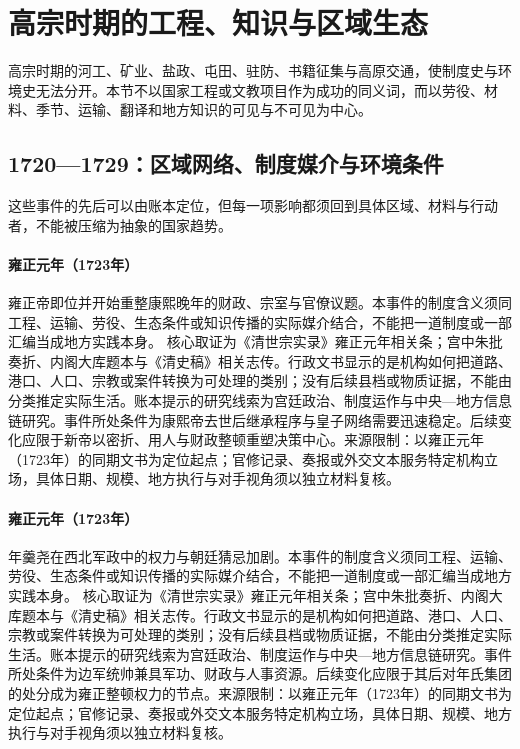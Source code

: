 \section{高宗时期的工程、知识与区域生态}
高宗时期的河工、矿业、盐政、屯田、驻防、书籍征集与高原交通，使制度史与环境史无法分开。本节不以国家工程或文教项目作为成功的同义词，而以劳役、材料、季节、运输、翻译和地方知识的可见与不可见为中心。
\subsection{1720—1729：区域网络、制度媒介与环境条件}
这些事件的先后可以由账本定位，但每一项影响都须回到具体区域、材料与行动者，不能被压缩为抽象的国家趋势。
\hypertarget{civic:EQ-1723-YONGZHENG-ACCESSION}{}\paragraph{雍正元年（1723年）}雍正帝即位并开始重整康熙晚年的财政、宗室与官僚议题。本事件的制度含义须同工程、运输、劳役、生态条件或知识传播的实际媒介结合，不能把一道制度或一部汇编当成地方实践本身。 核心取证为《清世宗实录》雍正元年相关条；宫中朱批奏折、内阁大库题本与《清史稿》相关志传。行政文书显示的是机构如何把道路、港口、人口、宗教或案件转换为可处理的类别；没有后续县档或物质证据，不能由分类推定实际生活。账本提示的研究线索为宫廷政治、制度运作与中央—地方信息链研究。事件所处条件为康熙帝去世后继承程序与皇子网络需要迅速稳定。后续变化应限于新帝以密折、用人与财政整顿重塑决策中心。来源限制：以雍正元年（1723年）的同期文书为定位起点；官修记录、奏报或外交文本服务特定机构立场，具体日期、规模、地方执行与对手视角须以独立材料复核。
\hypertarget{civic:EQ-1723-JI-ZENGYUN-CASE}{}\paragraph{雍正元年（1723年）}年羹尧在西北军政中的权力与朝廷猜忌加剧。本事件的制度含义须同工程、运输、劳役、生态条件或知识传播的实际媒介结合，不能把一道制度或一部汇编当成地方实践本身。 核心取证为《清世宗实录》雍正元年相关条；宫中朱批奏折、内阁大库题本与《清史稿》相关志传。行政文书显示的是机构如何把道路、港口、人口、宗教或案件转换为可处理的类别；没有后续县档或物质证据，不能由分类推定实际生活。账本提示的研究线索为宫廷政治、制度运作与中央—地方信息链研究。事件所处条件为边军统帅兼具军功、财政与人事资源。后续变化应限于其后对年氏集团的处分成为雍正整顿权力的节点。来源限制：以雍正元年（1723年）的同期文书为定位起点；官修记录、奏报或外交文本服务特定机构立场，具体日期、规模、地方执行与对手视角须以独立材料复核。
